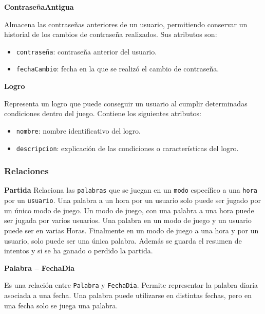 \documentclass[a4paper,11pt]{article}
\begin{document}
\par\vspace{0.5cm}
\noindent\textbf{ContraseñaAntigua}

Almacena las contraseñas anteriores de un usuario, permitiendo conservar un historial de los cambios de contraseña realizados. Sus atributos son:

\begin{itemize}
    \item \texttt{contraseña}: contraseña anterior del usuario.
    \item \texttt{fechaCambio}: fecha en la que se realizó el cambio de contraseña.
\end{itemize}

\par\vspace{0.5cm}
\noindent\textbf{Logro}

Representa un logro que puede conseguir un usuario al cumplir determinadas condiciones dentro del juego. Contiene los siguientes atributos:

\begin{itemize}
    \item \texttt{nombre}: nombre identificativo del logro.
    \item \texttt{descripcion}: explicación de las condiciones o características del logro.
\end{itemize}


\subsubsection{Relaciones}

\noindent\textbf{Partida}
Relaciona las \texttt{palabras} que se juegan en un \texttt{modo} específico a una \texttt{hora} por un \texttt{usuario}. Una palabra a un hora por un usuario solo puede ser jugado por un único modo de juego. Un modo de juego, con una palabra a una hora puede ser jugada por varios usuarios. Una palabra en un modo de juego y un usuario puede ser en varias Horas. Finalmente en un modo de juego a una hora y por un usuario, solo puede ser una única palabra. Además se guarda el resumen de intentos y si se ha ganado o perdido la partida.

\par\vspace{0.5cm}
\noindent\textbf{Palabra -- FechaDia}

Es una relación entre \texttt{Palabra} y \texttt{FechaDia}. Permite representar la palabra diaria asociada a una fecha. Una palabra puede utilizarse en distintas fechas, pero en una fecha solo se juega una palabra.
\end{document}
